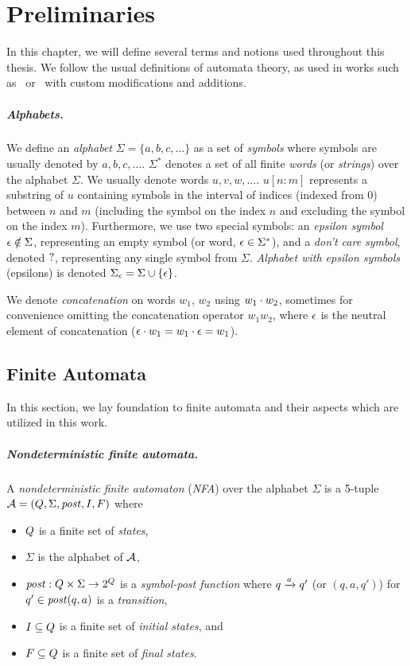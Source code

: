 \chapter{Preliminaries}
\label{sec:Preliminaries}
In this chapter, we will define several terms and notions used throughout this thesis.
We follow the usual definitions of automata theory, as used in works such as~\cite{Esparza} or~\cite{Sipser} with custom modifications and additions.

\paragraph{Alphabets.}
We define an \emph{alphabet} $\Sigma = \{ a, b, c, \ldots \}$ as a set of \emph{symbols} where
symbols are usually denoted by $a, b, c, \ldots$.
$\Sigma^*$ denotes a set of all finite \emph{words} (or \emph{strings}) over the alphabet $\Sigma$.
We usually denote words $u, v, w, \ldots$.
$u[n:m]$ represents a substring of $u$ containing symbols in the interval of indices (indexed from 0) between $n$ and $m$ (including the symbol on the index $n$ and excluding the symbol on the index $m$).
Furthermore, we use two special symbols: an \emph{epsilon symbol} $\epsilon \notin \Sigma$, representing an empty symbol (or word, $\epsilon \in \Sigma^*$), and a \emph{don't care symbol}, denoted $?$, representing any single symbol from $\Sigma$.
\emph{Alphabet with epsilon symbols} (epsilons) is denoted $\Sigma_\epsilon = \Sigma \cup \{ \epsilon \}$.

We denote \emph{concatenation} on words $w_1$, $w_2$ using $w_1 \cdot w_2$, sometimes for convenience omitting the concatenation operator $w_1w_2$, where $\epsilon$ is the neutral element of concatenation ($\epsilon \cdot w_1 = w_1 \cdot \epsilon = w_1$).

\section{Finite Automata}

In this section, we lay foundation to finite automata and their aspects which are utilized in this work.

\paragraph{Nondeterministic finite automata.}
A \emph{nondeterministic finite automaton} (\emph{NFA}) over the alphabet $\Sigma$ is a 5-tuple $\mathcal{A} = (Q, \Sigma, \mathit{post}, I, F)$ where
\begin{itemize}
    \item $Q$ is a finite set of \emph{states},
    \item $\Sigma$ is the alphabet of $\mathcal{A}$,
    \item $\mathit{post}: Q \times \Sigma \rightarrow 2^{Q}$ is a \emph{symbol-post function} where ${q} \xrightarrow{{a}} {q'}$ (or $(q, a, q')$) for $q' \in \mathit{post}(q, a)$ is a \emph{transition},
    \item $I \subseteq Q$ is a finite set of \emph{initial states}, and
    \item $F \subseteq Q$ is a finite set of \emph{final states}.
\end{itemize}

